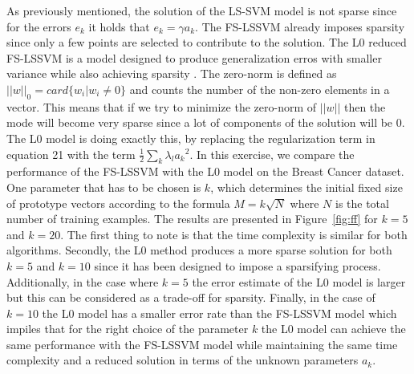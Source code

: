 \documentclass[conference,compsoc]{IEEEtran}
\begin{document}
As previously mentioned, the solution of the LS-SVM model is not sparse since for the errors $e_k$ it holds that $e_k=\gamma a_k$. The FS-LSSVM already imposes sparsity since only a few points are selected to contribute to the solution. The L0 reduced FS-LSSVM is a model designed to produce generalization erros with smaller variance while also achieving sparsity \cite{l0}. The zero-norm is defined as $||w||_0=card\{w_i|w_i\neq 0\}$ and counts the number of the non-zero elements in a vector. This means that if we try to minimize the zero-norm of $||w||$ then the mode will become very sparse since a lot of components of the solution will be 0. The L0 model is doing exactly this, by replacing the regularization term in equation 21 with the term $\frac{1}{2}\sum_{k}\lambda_l {a_k}^2$. In this exercise, we compare the performance of the FS-LSSVM with the L0 model on the Breast Cancer dataset. One parameter that has to be chosen is $k$, which determines the initial fixed size of prototype vectors according to the formula $M=k\sqrt{N}$ where $N$ is the total number of training examples. The results are presented in Figure~\ref{fig:ff} for $k=5$ and $k=20$.
The first thing to note is that the time complexity is similar for both algorithms. Secondly, the L0 method produces a more sparse solution for both $k=5$ and $k=10$ since it has been designed to impose a sparsifying process. Additionally, in the case where $k=5$ the error estimate of the L0 model is larger but this can be considered as a trade-off for sparsity. Finally, in the case of $k=10$ the L0 model has a smaller error rate than the FS-LSSVM model which impiles that for the right choice of the parameter $k$ the L0 model can achieve the same performance with the FS-LSSVM model while maintaining the same time complexity and a reduced solution in terms of the unknown parameters $a_k$.
\end{document}
